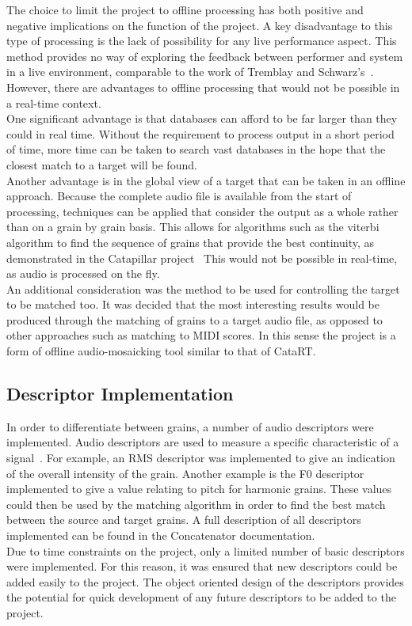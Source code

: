 \documentclass{scrartcl}
\begin{document}
    The choice to limit the project to offline processing has both positive and
    negative implications on the function of the project. A key disadvantage to
    this type of processing is the lack of possibility for any live performance
    aspect. This method provides no way of exploring the feedback between
    performer and system in a live environment, comparable to the work of
    Tremblay and Schwarz's~\citeyearpar{Tremblay2010}.
    However, there are advantages to offline processing that would not be
    possible in a real-time context.\\
    One significant advantage is that databases can afford to be far larger
    than they could in real time. Without the requirement to process output in
    a short period of time, more time can be taken to search vast databases in
    the hope that the closest match to a target will be found.\\
    Another advantage is in the global view of a target that can be taken in an
    offline approach. Because the complete audio file is available from the
    start of processing, techniques can be applied that consider the output as
    a whole rather than on a grain by grain basis. This allows for algorithms
    such as the viterbi algorithm to find the sequence of grains that provide
    the best continuity, as demonstrated in the Catapillar
    project~\parencite[p.4]{Schwarz2003} This would not be possible in
    real-time, as audio is processed on the fly.\\

    An additional consideration was the method to be used for controlling the
    target to be matched too. It was decided that the most interesting results
    would be produced through the matching of grains to a target audio file, as
    opposed to other approaches such as matching to MIDI scores. In this sense
    the project is a form of offline audio-mosaicking tool similar to that of
    CataRT.
    
    \subsection*{Descriptor Implementation}
    In order to differentiate between grains, a number of audio descriptors
    were implemented. Audio descriptors are used to measure a specific
    characteristic of a signal~\parencite[p.31]{Lerch2012}. For example, an RMS
    descriptor was implemented to give an indication of the overall intensity
    of the grain. Another example is the F0 descriptor implemented to give a
    value relating to pitch for harmonic grains. These values could then be
    used by the matching algorithm in order to find the best match between the
    source and target grains. A full description of all descriptors implemented
    can be found in the Concatenator documentation.\\
    Due to time constraints on the project, only a limited number of basic
    descriptors were implemented. For this reason, it was ensured that new
    descriptors could be added easily to the project. The object oriented
    design of the descriptors provides the potential for quick development of
    any future descriptors to be added to the project. 
\end{document}
